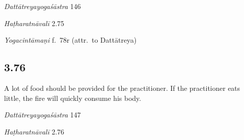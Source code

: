 \begin{ekdosis}
\begin{sources}[hp03_075]
\emph{Dattātreyayogaśāstra} 146
\begin{versinnote}
\end{versinnote}
\end{sources}

\begin{testimonia}[hp03_075]
\emph{Haṭharatnāvalī} 2.75
\begin{versinnote}
\end{versinnote}

\emph{Yogacintāmaṇi} f.~78r (attr.~to Dattātreya)
\begin{versinnote}
\end{versinnote}
\end{testimonia}



\subsection*{3.76}
\begin{translation}[hp03_076]
A lot of food should be provided for the practitioner. If the practitioner eats little, the fire will quickly consume his body.
\end{translation}

\begin{sources}[hp03_076]
\emph{Dattātreyayogaśāstra} 147
\begin{versinnote}
\end{versinnote}
\end{sources}

\begin{testimonia}[hp03_076]

\emph{Haṭharatnāvalī} 2.76
\begin{versinnote}
\end{versinnote}


\end{testimonia}
\end{ekdosis}
